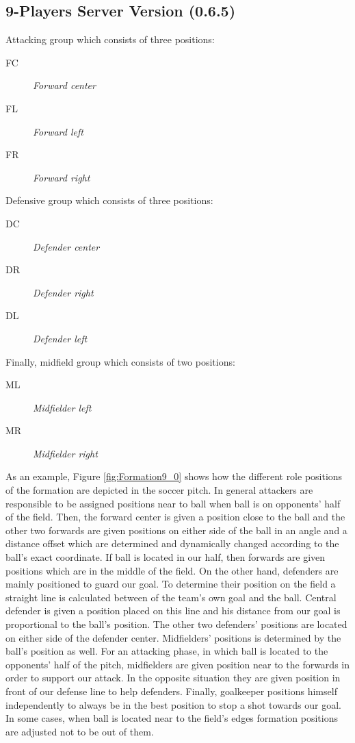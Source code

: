 \subsection{9-Players Server Version (0.6.5)}
Attacking group which consists of three positions:
\begin{description}
\item[FC] \textit{Forward center}
\item[FL] \textit{Forward left}
\item[FR] \textit{Forward right}
\end{description}
Defensive group which consists of three positions:
\begin{description}
\item[DC] \textit{Defender center}
\item[DR] \textit{Defender right }
\item[DL] \textit{Defender left}
\end{description}
Finally, midfield group which consists of two positions:
\begin{description}
\item[ML] \textit{Midfielder left}
\item[MR] \textit{Midfielder right}
\end{description}
As an example, Figure \ref{fig:Formation9_0} shows how the different role positions of the formation are depicted in the soccer pitch. In general attackers are responsible to be assigned positions near to ball when ball is on opponents' half of the field. Then, the forward center  is given a position close to the ball and the other two forwards are given positions on either side of the ball in an angle and a distance offset which are determined and dynamically changed according to the ball's exact coordinate. If ball is located in our half, then forwards are given positions which are in the middle of the field. On the other hand, defenders are mainly positioned to guard our goal. To determine their position on the field a straight line is calculated between of the team's own goal and the ball. Central defender is given a position placed on this line and his distance from our goal is proportional to the ball's position. The other two defenders' positions are located on either side of the defender center. Midfielders' positions is determined by the ball's position as well. For an attacking phase, in which ball is located to the opponents' half of the pitch, midfielders are given position near to the forwards in order to support our attack. In the opposite situation they are given position in front of our defense line to help defenders. Finally, goalkeeper positions himself independently to always be in the best position to stop a shot towards our goal. In some cases, when ball is located near to the field's edges formation positions are adjusted not to be out of them.
